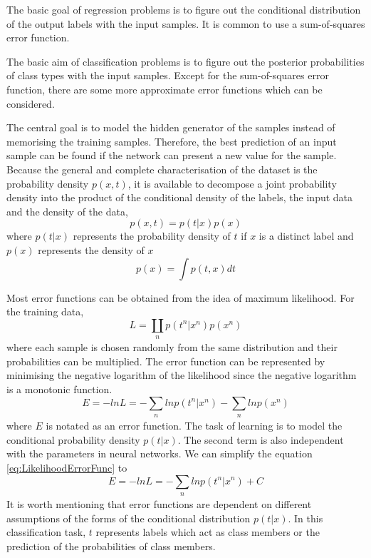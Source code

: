 The basic goal of regression problems is to figure out the conditional distribution of the output labels with the input samples. It is common to use a sum-of-squares error function.

The basic aim of classification problems is to figure out the posterior probabilities of class types with the input samples. Except for the sum-of-squares error function, there are some more approximate error functions which can be considered.

The central goal is to model the hidden generator of the samples instead of memorising the training samples. Therefore, the best prediction of an input sample can be found if the network can present a new value for the sample. Because the general and complete characterisation of the dataset is the probability density $p(x,t)$, it is available to decompose a joint probability density into the product of the conditional density of the labels, the input data and the density of the data,
\begin{equation}\label{eq:JointProbDensity}
p(x,t) = p(t|x)p(x)
\end{equation}
where $p(t|x)$ represents the probability density of $t$ if $x$ is a distinct label and $p(x)$ represents the density of $x$
\begin{equation}\label{eq:ProbDensityX}
p(x) = \int p(t,x)dt
\end{equation}

Most error functions can be obtained from the idea of maximum likelihood. For the training data, 
\begin{equation}\label{eq:LikelihoodLoss}
L = \coprod_{\substack{n}}  p(t^n|x^n)p(x^n)
\end{equation}
where each sample is chosen randomly from the same  distribution and their probabilities can be multiplied. The error function can be represented by minimising the negative logarithm of the likelihood since the negative logarithm is a monotonic function.
\begin{equation}\label{eq:LikelihoodErrorFunc}
E = -ln L = -\sum_{\substack{n}} ln p(t^n|x^n) - \sum_{\substack{n}}lnp(x^n)
\end{equation}
where $E$ is notated as an error function. The task of learning is to model the conditional probability density $p(t|x)$. The second term is also independent with the parameters in neural networks.  We can simplify the equation \ref{eq:LikelihoodErrorFunc} to
\begin{equation}\label{eq:SimLikelihoodErrorFunc}
E = -ln L = -\sum_{\substack{n}} ln p(t^n|x^n) + C
\end{equation}
It is worth mentioning that error functions are dependent on different assumptions of the forms of the conditional distribution $p(t|x)$. In this classification task, $t$ represents labels which act as class members or the prediction of the probabilities of class members.

